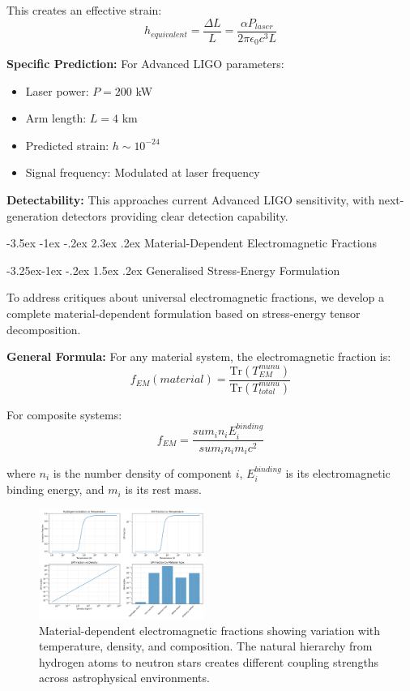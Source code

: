 \documentclass[10pt,twocolumn]{article}
\makeatletter
\renewcommand\section{\@startsection{section}{1}{\z@}%
  {-3.5ex \@plus -1ex \@minus -.2ex}%
  {2.3ex \@plus.2ex}%
  {\normalfont\large\bfseries}}
\renewcommand\subsection{\@startsection{subsection}{2}{\z@}%
  {-3.25ex\@plus -1ex \@minus -.2ex}%
  {1.5ex \@plus .2ex}%
  {\normalfont\normalsize\bfseries}}
\makeatother
\begin{document}
This creates an effective strain:
\begin{equation}
h_{equivalent} = \frac{\Delta L}{L} = \frac{\alpha P_{laser}}{2\pi \epsilon_0 c^3 L}
\end{equation}

\textbf{Specific Prediction:}
For Advanced LIGO parameters:
\begin{itemize}
\item Laser power: $P = 200$ kW
\item Arm length: $L = 4$ km
\item Predicted strain: $h \sim 10^{-24}$
\item Signal frequency: Modulated at laser frequency
\end{itemize}

\textbf{Detectability:} This approaches current Advanced LIGO sensitivity, with next-generation detectors providing clear detection capability.

\section{Material-Dependent Electromagnetic Fractions}

\subsection{Generalised Stress-Energy Formulation}

To address critiques about universal electromagnetic fractions, we develop a complete material-dependent formulation based on stress-energy tensor decomposition.

\textbf{General Formula:}
For any material system, the electromagnetic fraction is:
\begin{equation}
f_{EM}(material) = \frac{\text{Tr}(T^{mu nu}_{EM})}{\text{Tr}(T^{mu nu}_{total})}
\end{equation}

For composite systems:
\begin{equation}
f_{EM} = \frac{sum_i n_i E_i^{binding}}{sum_i n_i m_i c^2}
\end{equation}

where $n_i$ is the number density of component $i$, $E_i^{binding}$ is its electromagnetic binding energy, and $m_i$ is its rest mass.

\begin{figure}[h]
\centering
\includegraphics[width=0.48\textwidth]{../figures/generalized_em_fractions.png}
\caption{Material-dependent electromagnetic fractions showing variation with temperature, density, and composition. The natural hierarchy from hydrogen atoms to neutron stars creates different coupling strengths across astrophysical environments.}
\label{fig:em_fractions}
\end{figure}
\end{document}
